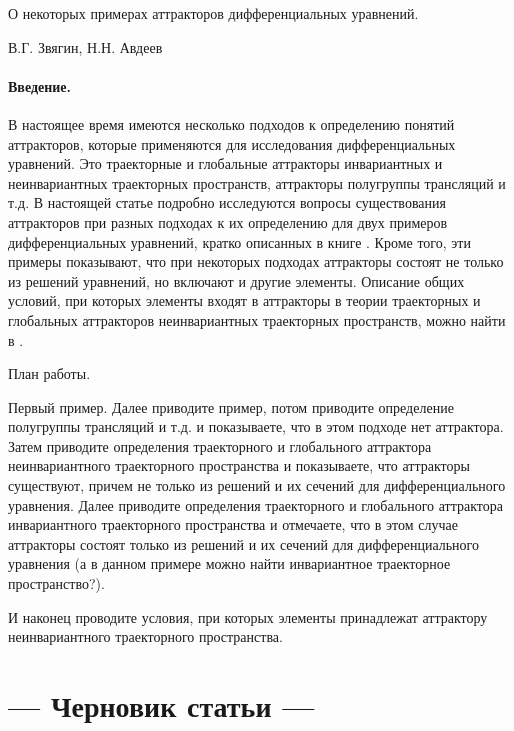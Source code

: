 
\LARGE




О некоторых примерах аттракторов дифференциальных уравнений.

                                   В.Г. Звягин, Н.Н. Авдеев

\paragraph{Введение.}
В настоящее время имеются несколько подходов к определению понятий аттракторов,
которые применяются для исследования дифференциальных уравнений.
Это траекторные и глобальные аттракторы инвариантных и неинвариантных траекторных пространств,
аттракторы полугруппы трансляций и т.д.
В настоящей статье подробно исследуются вопросы существования аттракторов
при разных подходах к их определению для двух примеров дифференциальных уравнений,
кратко описанных в книге \cite{Vorotnikov}.
Кроме того, эти примеры показывают, что при некоторых подходах аттракторы состоят не только из решений уравнений,
но включают и другие элементы.
Описание общих условий,
при которых элементы входят в аттракторы в теории траекторных и глобальных аттракторов неинвариантных траекторных пространств,
можно найти в \cite{Kondratyev}.


План работы.

Первый пример.
Далее приводите пример, потом приводите определение полугруппы трансляций и т.д. и показываете, что в этом подходе нет аттрактора.
Затем приводите определения  траекторного и глобального аттрактора неинвариантного траекторного пространства и показываете, что аттракторы существуют, причем не только из решений  и их сечений для дифференциального уравнения.
Далее приводите определения  траекторного и глобального аттрактора инвариантного траекторного пространства  и отмечаете, что в этом случае аттракторы состоят только из решений и их сечений  для дифференциального уравнения
(а в данном примере можно найти инвариантное траекторное пространство?).

И наконец проводите условия, при которых элементы принадлежат аттрактору неинвариантного траекторного пространства.


\section*{--- Черновик статьи ---}




